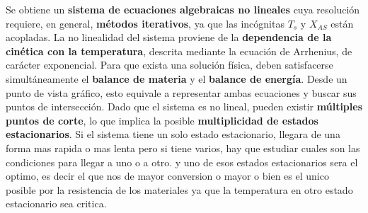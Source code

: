\begin{flushleft}

	\vspace{1em}
	Se obtiene un \textbf{sistema de ecuaciones algebraicas no lineales} cuya resolución requiere, en general, \textbf{métodos iterativos}, ya que las incógnitas $T_s$ y $X_{AS}$ están acopladas. La no linealidad del sistema proviene de la \textbf{dependencia de la cinética con la temperatura}, descrita mediante la ecuación de Arrhenius, de carácter exponencial.
	\vspace{1em}
	Para que exista una solución física, deben satisfacerse simultáneamente el \textbf{balance de materia} y el \textbf{balance de energía}. Desde un punto de vista gráfico, esto equivale a representar ambas ecuaciones y buscar sus puntos de intersección. Dado que el sistema es no lineal, pueden existir \textbf{múltiples puntos de corte},
	lo que implica la posible \textbf{multiplicidad de estados estacionarios}. Si el sistema tiene un solo estado estacionario, llegara de una forma mas rapida o mas lenta pero si tiene varios, hay que estudiar cuales son las condiciones para llegar a uno o a otro. y uno de esos estados estacionarios sera el optimo, es decir el que nos de mayor conversion o mayor o bien es el unico posible por la resistencia de los materiales ya que la temperatura en otro estado estacionario sea critica.
\end{flushleft}
